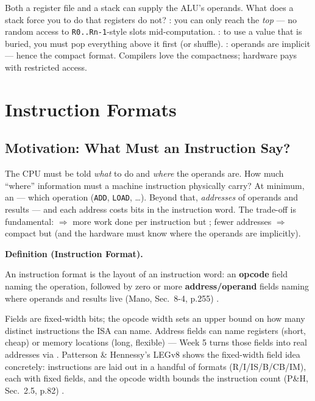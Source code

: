 \documentclass[11pt]{article}
\newenvironment{definitionbox}[1]{%
  \par\noindent\textbf{Definition (#1).}\ \itshape
}{\par\vspace{0.3em}}
\begin{document}
Both a register file and a stack can supply the ALU's operands. What does a stack force you to do that registers do not? : you can only reach the \emph{top} --- no random access to \texttt{R0..Rn-1}-style slots mid-computation. : to use a value that is buried, you must pop everything above it first (or shuffle). : operands are implicit --- hence the compact  format. Compilers love the compactness; hardware pays with restricted access.

\section{Instruction Formats}
\label{sec:instruction-formats}

\subsection{Motivation: What Must an Instruction Say?}

The CPU must be told \emph{what} to do and \emph{where} the operands are. How much ``where'' information must a machine instruction physically carry? At minimum, an  --- which operation (\texttt{ADD}, \texttt{LOAD}, \dots). Beyond that, \emph{addresses} of operands and results --- and each address costs bits in the instruction word. The trade-off is fundamental:  $\Rightarrow$ more work done per instruction but ; fewer addresses $\Rightarrow$ compact but  (and the hardware must know where the operands are implicitly).

\begin{definitionbox}{Instruction Format}
An instruction format is the layout of an instruction word: an \textbf{opcode} field naming the operation, followed by zero or more \textbf{address/operand} fields naming where operands and results live (Mano, Sec.~8-4, p.255) \cite{Mano1993_computer_system_architecture}.
\end{definitionbox}

Fields are fixed-width bits; the opcode width sets an upper bound on how many distinct instructions the ISA can name. Address fields can name registers (short, cheap) or memory locations (long, flexible) --- Week 5 turns those fields into real addresses via . Patterson \& Hennessy's LEGv8 shows the fixed-width field idea concretely: instructions are laid out in a handful of formats (R/I/IS/B/CB/IM), each with fixed fields, and the opcode width bounds the instruction count (P\&H, Sec.~2.5, p.82) \cite{PattersonHennessy2017_computer_organization_design}.
\end{document}
